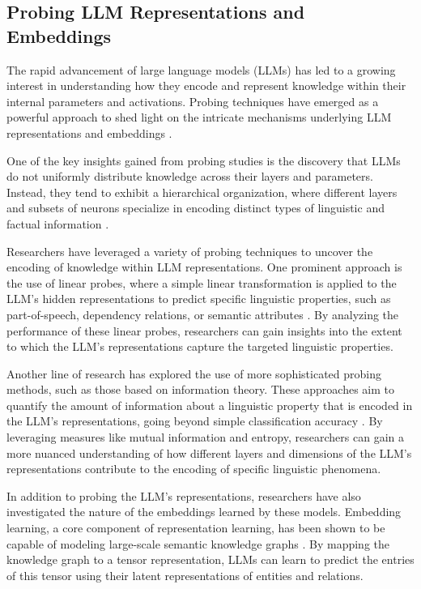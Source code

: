 \documentclass[11pt]{article}
\begin{document}
\subsection{Probing LLM Representations and Embeddings}

The rapid advancement of large language models (LLMs) has led to a growing interest in understanding how they encode and represent knowledge within their internal parameters and activations. Probing techniques have emerged as a powerful approach to shed light on the intricate mechanisms underlying LLM representations and embeddings \cite{ref237,ref245}.

One of the key insights gained from probing studies is the discovery that LLMs do not uniformly distribute knowledge across their layers and parameters. Instead, they tend to exhibit a hierarchical organization, where different layers and subsets of neurons specialize in encoding distinct types of linguistic and factual information \cite{ref246}.

Researchers have leveraged a variety of probing techniques to uncover the encoding of knowledge within LLM representations. One prominent approach is the use of linear probes, where a simple linear transformation is applied to the LLM's hidden representations to predict specific linguistic properties, such as part-of-speech, dependency relations, or semantic attributes \cite{ref247,ref248}. By analyzing the performance of these linear probes, researchers can gain insights into the extent to which the LLM's representations capture the targeted linguistic properties.

Another line of research has explored the use of more sophisticated probing methods, such as those based on information theory. These approaches aim to quantify the amount of information about a linguistic property that is encoded in the LLM's representations, going beyond simple classification accuracy \cite{ref249}. By leveraging measures like mutual information and entropy, researchers can gain a more nuanced understanding of how different layers and dimensions of the LLM's representations contribute to the encoding of specific linguistic phenomena.

In addition to probing the LLM's representations, researchers have also investigated the nature of the embeddings learned by these models. Embedding learning, a core component of representation learning, has been shown to be capable of modeling large-scale semantic knowledge graphs \cite{ref250}. By mapping the knowledge graph to a tensor representation, LLMs can learn to predict the entries of this tensor using their latent representations of entities and relations.
\end{document}
